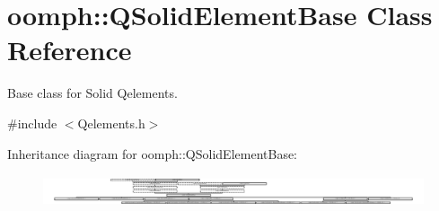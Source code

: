 \hypertarget{classoomph_1_1QSolidElementBase}{}\section{oomph\+:\+:Q\+Solid\+Element\+Base Class Reference}
\label{classoomph_1_1QSolidElementBase}


Base class for Solid Qelements.  




{\ttfamily \#include $<$Qelements.\+h$>$}

Inheritance diagram for oomph\+:\+:Q\+Solid\+Element\+Base\+:\begin{figure}[H]
\begin{center}
\leavevmode
\includegraphics[height=0.933333cm]{classoomph_1_1QSolidElementBase}
\end{center}
\end{figure}
